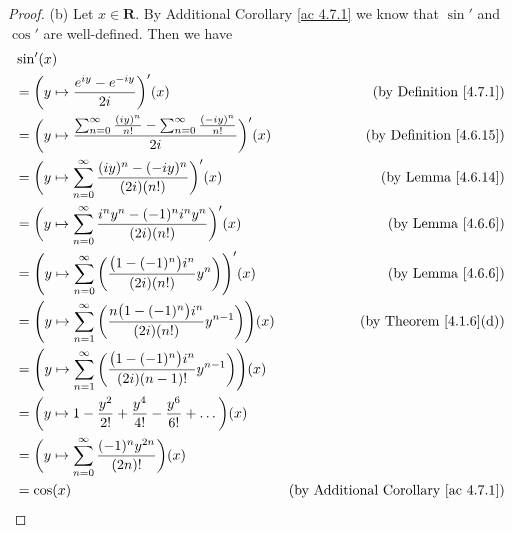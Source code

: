 \begin{proof}{(b)}
    Let \(x \in \mathbf{R}\).
    By Additional Corollary \ref{ac 4.7.1} we know that \(\sin'\) and \(\cos'\) are well-defined.
    Then we have
    \begin{align*}
         & \sin'(x)                                                                                                                                                                   \\
         & = \bigg(y \mapsto \frac{e^{i y} - e^{- i y}}{2i}\bigg)'(x)                                                               & \text{(by Definition \ref{4.7.1})}              \\
         & = \bigg(y \mapsto \frac{\sum_{n = 0}^\infty \frac{(i y)^n}{n!} - \sum_{n = 0}^\infty \frac{(- i y)^n}{n!}}{2i}\bigg)'(x) & \text{(by Definition \ref{4.6.15})}             \\
         & = \bigg(y \mapsto \sum_{n = 0}^\infty \frac{(i y)^n - (- i y)^n}{(2i) (n!)}\bigg)'(x)                                    & \text{(by Lemma \ref{4.6.14})}                  \\
         & = \bigg(y \mapsto \sum_{n = 0}^\infty \frac{i^n y^n - (-1)^n i^n y^n}{(2i) (n!)}\bigg)'(x)                               & \text{(by Lemma \ref{4.6.6})}                   \\
         & = \Bigg(y \mapsto \sum_{n = 0}^\infty \bigg(\frac{\big(1 - (-1)^n\big) i^n}{(2i) (n!)} y^n\bigg)\Bigg)'(x)               & \text{(by Lemma \ref{4.6.6})}                   \\
         & = \Bigg(y \mapsto \sum_{n = 1}^\infty \bigg(\frac{n \big(1 - (-1)^n\big) i^n}{(2i) (n!)} y^{n - 1}\bigg)\Bigg)(x)        & \text{(by Theorem \ref{4.1.6}(d))}              \\
         & = \Bigg(y \mapsto \sum_{n = 1}^\infty \bigg(\frac{\big(1 - (-1)^n\big) i^n}{(2i) (n - 1)!} y^{n - 1}\bigg)\Bigg)(x)                                                        \\
         & = \bigg(y \mapsto 1 - \frac{y^2}{2!} + \frac{y^4}{4!} - \frac{y^6}{6!} + \dots\bigg)(x)                                                                                    \\
         & = \bigg(y \mapsto \sum_{n = 0}^\infty \frac{(-1)^n y^{2n}}{(2n)!}\bigg)(x)                                                                                                 \\
         & = \cos(x)                                                                                                                & \text{(by Additional Corollary \ref{ac 4.7.1})}

\end{align*}
\end{proof}
